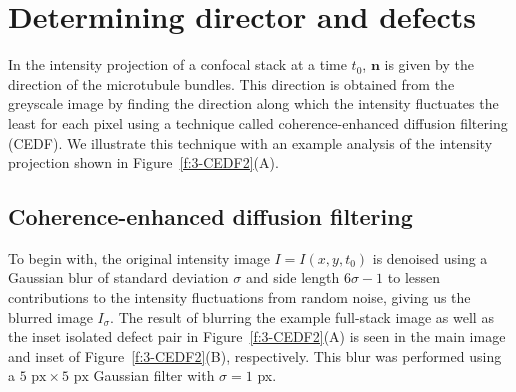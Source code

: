 \section{Determining director and defects}
In the intensity projection of a confocal stack at a time $t_0$, $\mathbf{n}$ is given by the direction of the microtubule bundles.
This direction is obtained from the greyscale image by finding the direction along which the intensity fluctuates the least for each pixel using a technique called coherence-enhanced diffusion filtering (CEDF)\cite{RN30}.
We illustrate this technique with an example analysis of the intensity projection shown in Figure~\ref{f:3-CEDF2}(A).


\subsection{Coherence-enhanced diffusion filtering}
To begin with, the original intensity image $I = I(x,y,t_0)$ is denoised using a Gaussian blur of standard deviation $\sigma$ and side length $6 \sigma -1$ to lessen contributions to the intensity fluctuations from random noise, giving us the blurred image $I_{\sigma}$.
The result of blurring the example full-stack image as well as the inset isolated defect pair in Figure~\ref{f:3-CEDF2}(A) is seen in the main image and inset of Figure~\ref{f:3-CEDF2}(B), respectively.
This blur was performed using a $5 \textrm{ px} \times 5 \textrm{ px}$ Gaussian filter with $\sigma= 1$ px.\\

